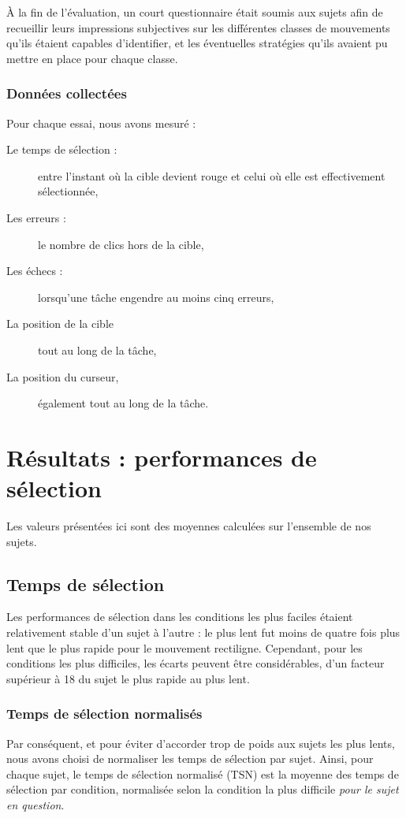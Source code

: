 	À la fin de l'évaluation, un court questionnaire était soumis aux sujets afin de recueillir leurs impressions subjectives sur les différentes \og classes \fg{} de mouvements qu'ils étaient capables d'identifier, et les éventuelles stratégies qu'ils avaient pu mettre en place pour chaque classe.
	
	\subsubsection{Données collectées}
	Pour chaque essai, nous avons mesuré :
	
	\begin{description}
		\item[Le temps de sélection :] entre l'instant où la cible devient rouge et celui où elle est effectivement sélectionnée,
		\item[Les erreurs :] le nombre de clics hors de la cible,
		\item[Les échecs :] lorsqu'une tâche engendre au moins cinq erreurs,
		\item[La position de la cible] tout au long de la tâche,
		\item[La position du curseur,] également tout au long de la tâche.
	\end{description}

\section{Résultats : performances de sélection}
	Les valeurs présentées ici sont des moyennes calculées sur l'ensemble de nos sujets.
	
	\subsection{Temps de sélection}
	Les performances de sélection dans les conditions les plus faciles étaient relativement stable d'un sujet à l'autre : le plus lent fut moins de quatre fois plus lent que le plus rapide pour le mouvement rectiligne. Cependant, pour les conditions les plus difficiles, les écarts peuvent être considérables, d'un facteur supérieur à 18 du sujet le plus rapide au plus lent.
	
	\subsubsection{Temps de sélection normalisés}
	Par conséquent, et pour éviter d'accorder trop de poids aux sujets les plus lents, nous avons choisi de normaliser les temps de sélection par sujet. Ainsi, pour chaque sujet, le temps de sélection normalisé (TSN) est la moyenne des temps de sélection par condition, normalisée selon la condition la plus difficile \emph{pour le sujet en question}.
	
